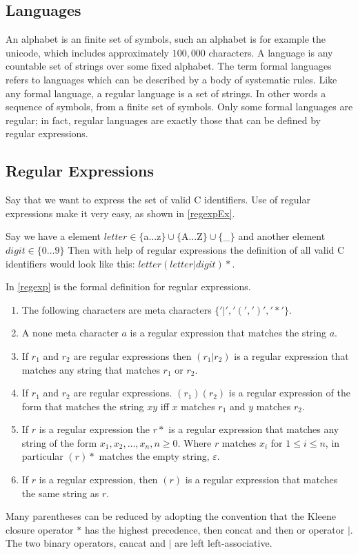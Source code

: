 \subsection{Languages}
An alphabet is an finite set of symbols, such an alphabet is for example the 
unicode, which includes approximately $100,000$ characters. A language is any 
countable set of strings over some fixed alphabet. \cite{Aho2006}
The term formal languages refers to languages which can be described by a body 
of systematic rules. Like any formal language, a regular language is a set of 
strings. In other words a sequence of symbols, from a finite set of symbols. 
Only some formal languages are regular; in fact, regular languages are exactly 
those that can be defined by regular expressions. \cite{Ranta2012}
\subsection{Regular Expressions}
Say that we want to express the set of valid C identifiers. Use of regular 
expressions make it very easy, as shown in \cref{regexpEx}. 
\begin{example}\label{regexpEx}
Say we have a element $letter \in \{$a$ \dots $z$\} \cup \{$A$ \dots $Z$\} \cup 
\{$\_$\}$
and another element $digit \in \{0 \dots 9\}$
Then with help of regular expressions the definition of all valid C identifiers 
would look like this: $letter (letter | digit)*$. \cite{Aho2006}
\end{example}
In \cref{regexp} is the formal definition for regular expressions.
\begin{definition}\label{regexp} \cite{Aho1990}
\newline
\begin{enumerate}
  \item The following characters are meta characters $\{ '|', '(', ')', '*' \}$.
  \item A none meta character $a$ is a regular expression that matches the 
      string $a$.
  \item If $r_1$ and $r_2$ are regular expressions then $(r_1 | r_2)$ is a 
      regular expression that matches any string that matches $r_1$ or $r_2$.
  \item If $r_1$ and $r_2$ are regular expressions. $(r_1)(r_2)$ is a regular
      expression of the form that matches the string $xy$ iff $x$ matches $r_1$
      and $y$ matches $r_2$.
  \item If $r$ is a regular expression the $r*$ is a regular expression that
      matches any string of the form $x_1, x_2, \dots , x_n, n \geq 0$.
      Where $r$ matches $x_i$ for $1 \leq i \leq n$, in particular $(r)*$ 
      matches the empty string, $\varepsilon$.
  \item If $r$ is a regular expression, then $(r)$ is a regular expression that
      matches the same string as $r$.
\end{enumerate}
\end{definition}
Many parentheses can be reduced by adopting the convention that the Kleene
closure operator $*$ has the highest precedence, then concat and then or
operator $|$. The two binary operators, cancat and $|$ are left 
left-associative. \cite{Aho1990}
